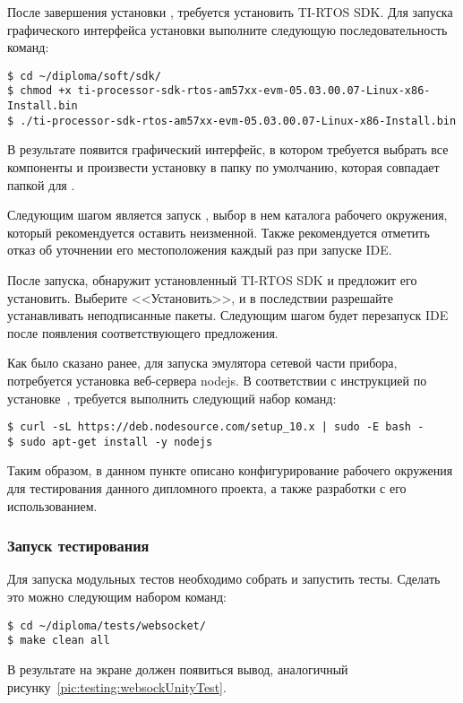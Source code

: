 После завершения установки , требуется установить TI-RTOS SDK.
Для запуска графического интерфейса установки выполните следующую последовательность
команд:
\begin{lstlisting}
$ cd ~/diploma/soft/sdk/
$ chmod +x ti-processor-sdk-rtos-am57xx-evm-05.03.00.07-Linux-x86-Install.bin
$ ./ti-processor-sdk-rtos-am57xx-evm-05.03.00.07-Linux-x86-Install.bin
\end{lstlisting}

В результате появится графический интерфейс, в котором требуется выбрать все
компоненты и произвести установку в папку по умолчанию, которая совпадает
папкой для .

Следующим шагом является запуск , выбор в нем каталога рабочего окружения,
который рекомендуется оставить неизменной. Также рекомендуется отметить отказ
об уточнении его местоположения каждый раз при запуске IDE.

После запуска,  обнаружит установленный TI-RTOS SDK и предложит его
установить. Выберите <<Установить>>, и в последствии разрешайте устанавливать
неподписанные  пакеты. Следующим шагом будет перезапуск IDE после появления
соответствующего предложения.

Как было сказано ранее, для запуска эмулятора сетевой части прибора, потребуется
установка веб-сервера nodejs. В соответствии с инструкцией по
установке~\cite{nodejs_how_to_install}, требуется выполнить следующий
набор команд:
\begin{lstlisting}
$ curl -sL https://deb.nodesource.com/setup_10.x | sudo -E bash -
$ sudo apt-get install -y nodejs
\end{lstlisting}

Таким образом, в данном пункте описано конфигурирование рабочего окружения для
тестирования данного дипломного проекта, а также разработки с его использованием.

\subsubsection{Запуск тестирования}

Для запуска модульных тестов необходимо собрать и запустить тесты. Сделать это
можно следующим набором команд:
\begin{lstlisting}
$ cd ~/diploma/tests/websocket/
$ make clean all
\end{lstlisting}

В результате на экране должен появиться вывод, аналогичный
рисунку~\ref{pic:testing:websockUnityTest}.

